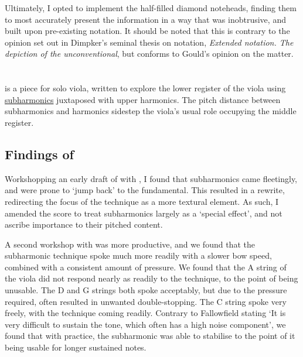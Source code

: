 Ultimately, I opted to implement the half-filled diamond noteheads, finding them to most accurately present the information in a way that was inobtrusive, and built upon pre-existing notation.
It should be noted that this is contrary to the opinion set out in Dimpker's seminal thesis on notation, \emph{Extended notation. The depiction of the
unconventional}, but conforms to Gould's opinion on the matter.\autocites[120-121]{dimpkerExtendedNotationDepiction2012}[61]{gouldBars2011}


\section{\violaPiece} \label{sec:violaPiece}
\violaPiece \space is a piece for solo viola, written to explore the lower register of the viola using \hyperref[sec:subharmonicsDiscussion]{subharmonics} juxtaposed with upper harmonics. 
The pitch distance between subharmonics and harmonics sidestep the viola's usual role occupying the middle register.



\subsection{Findings of \violaPiece}

Workshopping an early draft of \violaPiece \space with \violaParticipant, I found that subharmonics came fleetingly, and were prone to `jump back' to the fundamental.\autocite[]{appleseedFeedbackExploratorySession2019}
This resulted in a rewrite, redirecting the focus of the technique as a more textural element. 
As such, I amended the score to treat subharmonics largely as a `special effect', and not ascribe importance to their pitched content.


A second workshop with \violaParticipant was more productive, and we found that the subharmonic technique spoke much more readily with a slower bow speed, combined with a consistent amount of pressure.\autocite[]{appleseedFeedbackSightreadingSession2019}
We found that the A string of the viola did not respond nearly as readily to the technique, to the point of being unusable.
The D and G strings both spoke acceptably, but due to the pressure required, often resulted in unwanted double-stopping.
The C string spoke very freely, with the technique coming readily.
Contrary to Fallowfield stating `It is very difficult to sustain the tone, which often has a high noise component', we found that with practice, the subharmonic was able to stabilise to the point of it being usable for longer sustained notes.\autocites[http://www.cellomap.com/index/the-string/plucking-striking-and-bowing-the-string/how.html]{fallowfieldCelloMapHandbook2009}[]{fallowfieldCelloMapExample2013}[]{appleseedFeedbackSightreadingSession2019}

